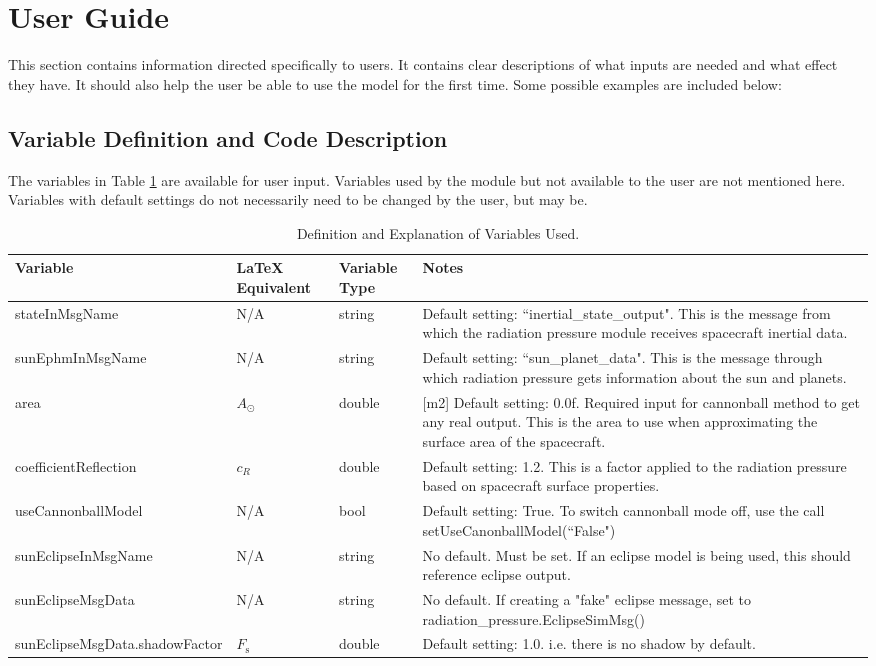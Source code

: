 \section{User Guide}
This section contains information directed specifically to users. It contains clear descriptions of what inputs are needed and what effect they have. It should also help the user be able to use the model for the first time. Some possible examples are included below:

\subsection{Variable Definition and Code Description}
The variables in Table \ref{tabular:vars} are available for user input. Variables used by the module but not available to the user are not mentioned here. Variables with default settings do not necessarily need to be changed by the user, but may be.
\begin{table}[H]
	\caption{Definition and Explanation of Variables Used.}
	\label{tab:errortol}
	\centering \fontsize{10}{10}\selectfont
	\begin{tabular}{ | m{5cm}| m{2cm} | m{1.5cm} | m{6cm} |} %
		\hline
		\textbf{Variable}   		& \textbf{LaTeX Equivalent} 	                  &		\textbf{Variable Type}   & \textbf{Notes} \\ \hline
		stateInMsgName			&N/A		   							    & string 								& Default setting: ``inertial\_state\_output". This is the message from which the radiation pressure module receives spacecraft inertial data.\\ \hline
		sunEphmInMsgName	& N/A 										& string 								& Default setting: ``sun\_planet\_data". This is the message through which radiation pressure gets information about the sun and planets.\\ \hline
		area 						  	  & $A_{\odot}$							  & double 								& [m2] Default setting: 0.0f. Required input for cannonball method to get any real output. This is the area to use when approximating the surface area of the spacecraft.\\ \hline
		coefficientReflection 	  & $c_{R}$ 								& double 								& Default setting: 1.2. This is a factor applied to the radiation pressure based on spacecraft surface properties.\\ \hline
		useCannonballModel	   & N/A 									   & bool 									& Default setting: True. To switch cannonball mode off, use the call setUseCanonballModel(``False")\\ \hline
		sunEclipseInMsgName	 & N/A 										 & string									& No default. Must be set. If an eclipse model is being used, this should reference eclipse output. \\ \hline
		sunEclipseMsgData		& N/A										& string									& No default. If creating a "fake" eclipse message, set to radiation\_pressure.EclipseSimMsg() \\ \hline
		sunEclipseMsgData.shadowFactor & $F_{\mathrm{s}}$& double								& Default setting: 1.0. i.e. there is no shadow by default. \\ \hline
	\end{tabular}
	\label{tabular:vars}
\end{table}

